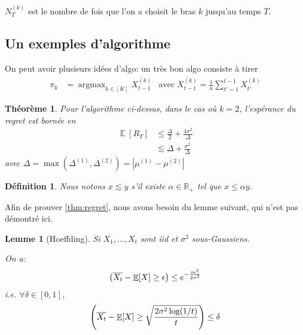 \documentclass{article}
\DeclareMathOperator*{\argmax}{argmax}
\DeclareMathOperator*{\E}{\mathbb{E}}
\let\P\relax
\DeclareMathOperator*{\P}{\mathbb{P}}
\newtheorem{definition}{Définition}[section]
\newtheorem{theorem}{Théorème}[section]
\newtheorem{lemma}{Lemme}[section]
\theoremstyle{remark}
\theoremstyle{remark}
\begin{document}
$N_T^{(k)}$ est le nombre de fois que l'on a choisit le bras $k$ jusqu'au temps $T$.

\subsection{Un exemples d'algorithme}

On peut avoir plusieurs idées d'algo: un très bon algo consiste à tirer
\begin{align*}
  \pi_k &= \argmax_{k\in[K]} \overline{X^{(k)}_{t-1}} & \text{avec}\; \overline{X^{(k)}_{t-1}} = \frac{1}{n} \sum_{t'=1}^{t-1} X^{(k)}_{t'}
\end{align*}

\begin{theorem}
  \label{thm:regret}
  Pour l'algorithme ci-dessus, dans le cas où $k=2$, l'espérance du regret est bornée en
  \begin{align*}
    \E[R_T] &\leq \frac{\Delta}{2} + \frac{4\sigma^2}{\Delta} \\
    & \lesssim \Delta + \frac{\sigma^2}{\Delta}
  \end{align*}
  avec $\Delta = \max(\Delta^{(1)}, \Delta^{(2)}) = |\mu^{(1)} - \mu^{(2)}|$
\end{theorem}

\begin{definition}
  Nous notons $x \lesssim y$ s'il existe $\alpha \in \mathbb{R}_+$ tel que $x \leq \alpha y$.
\end{definition}

Afin de prouver \autoref{thm:regret}, nous avons besoin du lemme suivant, qui n'est pas démontré ici.
\begin{lemma}[Hoeffding]
  \label{lem:hoeffding}
  Si $X_1, ..., X_t$ sont iid et $\sigma^2$ sous-Gaussiens.

  On a:
  $$
  \P\left(\overline{X_t} - \E[X] \geq \epsilon \right) \leq e^{-\frac{t \epsilon^2}{2 \sigma^2}}
  $$
  i.e. $\forall \delta \in [0,1]$,
  $$
  \P\left(\overline{X_t} - \E[X] \geq \sqrt{\frac{2\sigma^2 \log(1/t)}{t}} \right) \leq \delta
  $$
\end{lemma}
\end{document}
